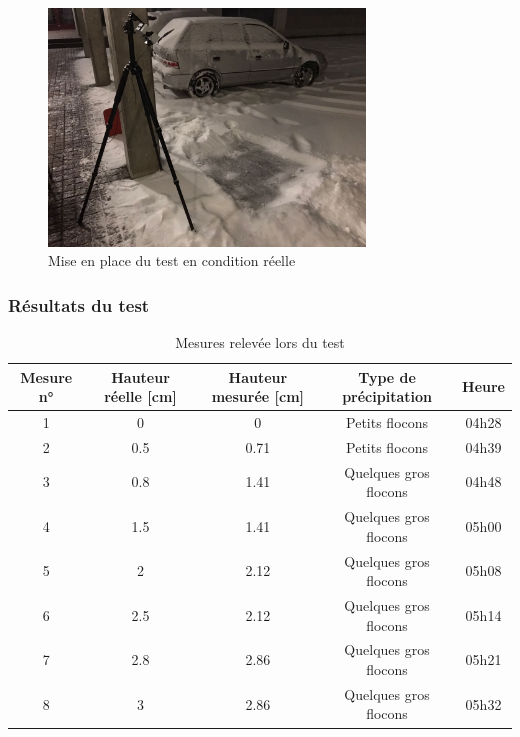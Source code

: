 \begin{figure}[H]
    \centering
    \includegraphics[width=0.75\textwidth]{Images/LiDAR/ReadTests_Setup.jpeg}
    \caption{Mise en place du test en condition réelle}
    \label{fig:RealTest_Setup}
\end{figure}

\subsubsection{Résultats du test}

\begin{table}[H]
    \centering
    \begin{tabular}{|c|c|c|c|c|}
        \hline
        Mesure n° & Hauteur réelle [cm] & Hauteur mesurée [cm] & Type de précipitation & Heure \\
        \hline\hline
        1 & 0 & 0 & Petits flocons & 04h28 \\
        \hline
        2 & 0.5 & 0.71 & Petits flocons & 04h39 \\
        \hline
        3 & 0.8 & 1.41 & Quelques gros flocons & 04h48 \\
        \hline
        4 & 1.5 & 1.41 & Quelques gros flocons & 05h00 \\
        \hline
        5 & 2 & 2.12 & Quelques gros flocons & 05h08 \\
        \hline
        6 & 2.5 & 2.12 & Quelques gros flocons & 05h14 \\
        \hline
        7 & 2.8 & 2.86 & Quelques gros flocons & 05h21 \\
        \hline
        8 & 3 & 2.86 & Quelques gros flocons & 05h32 \\
        \hline
        
    \end{tabular}
    \caption{Mesures relevée lors du test}
    \label{table:SnowingState}
\end{table}


